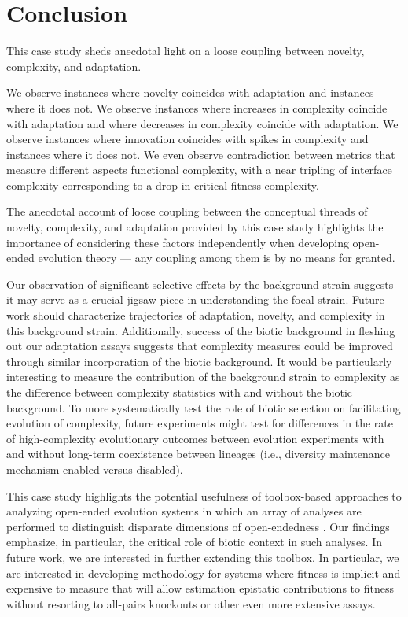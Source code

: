 \section{Conclusion}

This case study sheds anecdotal light on a loose coupling between novelty, complexity, and adaptation.

We observe instances where novelty coincides with adaptation and instances where it does not.
We observe instances where increases in complexity coincide with adaptation and where decreases in complexity coincide with adaptation.
We observe instances where innovation coincides with spikes in complexity and instances where it does not.
We even observe contradiction between metrics that measure different aspects functional complexity, with a near tripling of interface complexity corresponding to a drop in critical fitness complexity.

The anecdotal account of loose coupling between the conceptual threads of novelty, complexity, and adaptation provided by this case study highlights the importance of considering these factors independently when developing open-ended evolution theory --- any coupling among them is by no means for granted.

Our observation of significant selective effects by the background strain suggests it may serve as a crucial jigsaw piece in understanding the focal strain.
Future work should characterize trajectories of adaptation, novelty, and complexity in this background strain.
Additionally, success of the biotic background in fleshing out our adaptation assays suggests that complexity measures could be improved through similar incorporation of the biotic background.
It would be particularly interesting to measure the contribution of the background strain to complexity as the difference between complexity statistics with and without the biotic background.
To more systematically test the role of biotic selection on facilitating evolution of complexity, future experiments might test for differences in the rate of high-complexity evolutionary outcomes between evolution experiments with and without long-term coexistence between lineages (i.e., diversity maintenance mechanism enabled versus disabled).

This case study highlights the potential usefulness of toolbox-based approaches to analyzing open-ended evolution systems in which an array of analyses are performed to distinguish disparate dimensions of open-endedness \citep{dolson2019modes}.
Our findings emphasize, in particular, the critical role of biotic context in such analyses.
In future work, we are interested in further extending this toolbox.
In particular, we are interested in developing methodology for systems where fitness is implicit and expensive to measure that will allow estimation epistatic contributions to fitness without resorting to all-pairs knockouts or other even more extensive assays.


